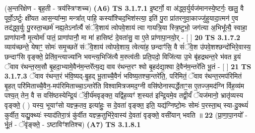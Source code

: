 \documentclass[17pt]{extarticle}
\begin{document}
                  \newline
                      (अ॒न्तरि॑क्षेण - बृह॒ती - त्रय॑स्त्रिꣳशच्च)  \textbf{(A6)} \newline \newline
                                        \textbf{ TS 3.1.7.1} \newline
                  इ॒ष्टर्गो॒ वा अ॑द्ध्व॒र्युर्यज॑मानस्ये॒ष्टर्गः॒ खलु॒ वै पूर्वो॒ऽर्ष्टुः क्षी॑यत आस॒न्या᳚न्मा॒ मन्त्रा᳚त् पाहि॒ कस्या᳚श्चिद॒भिश॑स्त्या॒ इति॑ पु॒रा प्रा॑तरनुवा॒काज्जु॑हुयादा॒त्मन॑ ए॒व तद॑द्ध्व॒र्युः पु॒रस्ता॒च्छर्म॑ नह्य॒तेऽना᳚र्त्यै संॅवे॒शाय॑ त्वोपवे॒शाय॑ त्वा गायत्रि॒या स्त्रि॒ष्टुभो॒ जग॑त्या अ॒भिभू᳚त्यै॒ स्वाहा॒ प्राणा॑पानौ मृ॒त्योर्मा॑ पातं॒ प्राणा॑पानौ॒ मा मा॑ हासिष्टं दे॒वता॑सु॒ वा ए॒ते प्रा॑णापा॒नयो॒र् - [  ] \textbf{  20} \newline
                  \newline
                                \textbf{ TS 3.1.7.2} \newline
                  व्याय॑च्छन्ते॒ येषाꣳ॒॒ सोमः॑ समृ॒च्छते॑ संॅवे॒शाय॑ त्वोपवे॒शाय॒ त्वेत्या॑ह॒ छन्दाꣳ॑सि॒ वै सं॑ॅवे॒श उ॑पवे॒शश्छन्दो॑भिरे॒वास्य॒ छन्दाꣳ॑सि वृङ्क्ते॒ प्रेति॑व॒न्त्याज्या॑नि भवन्त्य॒भिजि॑त्यै म॒रुत्व॑तीः प्रति॒पदो॒ विजि॑त्या उ॒भे बृ॑हद्रथन्त॒रे भ॑वत इ॒यं ॅवाव र॑थन्त॒रम॒सौ बृ॒हदा॒भ्यामे॒वैन॑म॒न्तरे᳚त्य॒द्य वाव र॑थन्त॒रꣳ श्वो बृ॒हद॑द्या॒श्वा दे॒वैन॑म॒न्तरे॑ति भू॒तं - [  ] \textbf{  21} \newline
                  \newline
                                \textbf{ TS 3.1.7.3} \newline
                  ॅवाव र॑थन्त॒रं भ॑वि॒ष्यद्-बृ॒॒हद् भू॒ताच्चै॒वैनं॑ भविष्य॒तश्चा॒न्तरे॑ति॒, परि॑मितं॒ ॅवाव र॑थन्त॒रमप॑रिमितं बृ॒हत् परि॑मिताच्चै॒वैन॒-मप॑रिमिताच्चा॒ऽन्तरे॑ति विश्वामित्रजमद॒ग्नी वसि॑ष्ठेनास्पर्द्धेताꣳ॒॒स ए॒तज्ज॒मद॑ग्नि र्विह॒व्य॑म पश्य॒त् तेन॒ वै स वसि॑ष्ठस्येन्द्रि॒यं ॅवी॒र्य॑मवृङ्क्त॒ यद्वि॑ह॒व्यꣳ॑ श॒स्यत॑ इन्द्रि॒यमे॒व तद्वी॒र्यं॑ ॅयज॑मानो॒ भ्रातृ॑व्यस्य वृङ्क्ते॒ ( ) यस्य॒ भूयाꣳ॑सो यज्ञ्क्र॒तव॒ इत्या॑हुः॒ स दे॒वता॑ वृङ्क्त॒ इति॒ यद्य॑ग्निष्टो॒मः सोमः॑ प॒रस्ता॒थ् स्या-दु॒क्थ्यं॑ कुर्वीत॒ यद्यु॒क्थ्यः॑ स्याद॑तिरा॒त्रं कु॑र्वीत यज्ञ्क्र॒तुभि॑रे॒वास्य॑ दे॒वता॑ वृङ्क्ते॒ वसी॑यान् भवति ॥ \textbf{  22 } \newline
                  \newline
                      (प्रा॒णा॒पा॒नयो᳚ - र्भू॒तं - ॅवृ॑ङ्क्ते॒ - ऽष्टाविꣳ॑शतिश्च)  \textbf{(A7)} \newline \newline
                                        \textbf{ TS 3.1.8.1} \newline
\end{document}
